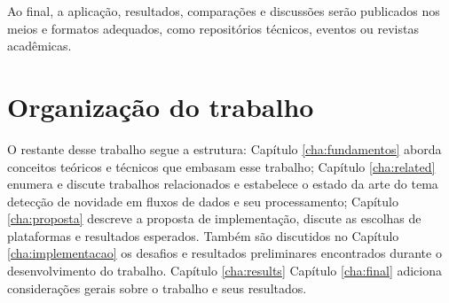 Ao final, a aplicação, resultados, comparações e discussões serão publicados
nos meios e formatos adequados, como repositórios técnicos, eventos ou revistas
acadêmicas.

\section{Organização do trabalho}

O restante desse trabalho segue a estrutura:
Capítulo \ref{cha:fundamentos} aborda conceitos teóricos e técnicos que embasam
esse trabalho;
Capítulo \ref{cha:related} enumera e discute trabalhos relacionados e estabelece
o estado da arte do tema detecção de novidade em fluxos de dados e seu
processamento;
Capítulo \ref{cha:proposta} descreve a proposta de implementação, discute as
escolhas de plataformas e resultados esperados.
Também são discutidos no Capítulo \ref{cha:implementacao} os desafios e
resultados preliminares encontrados durante o desenvolvimento do trabalho.
Capítulo \ref{cha:results} 
Capítulo \ref{cha:final} adiciona considerações gerais sobre o trabalho e seus
resultados.

